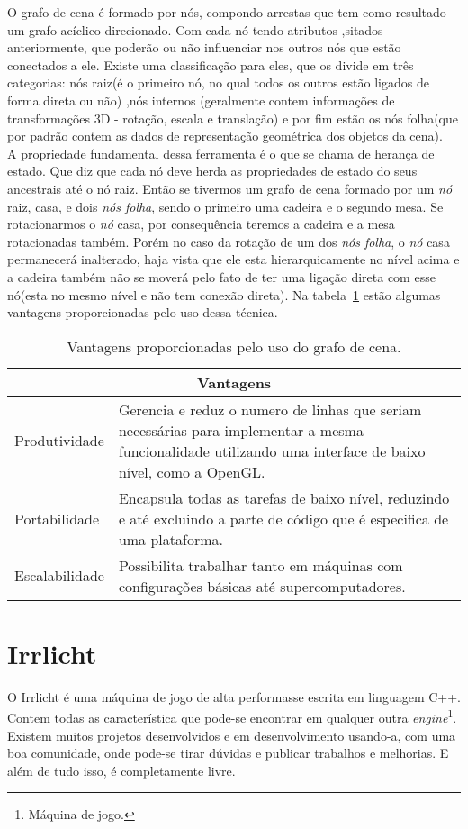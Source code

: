 O grafo de cena é formado por nós, compondo arrestas que tem como resultado um grafo acíclico direcionado. Com cada nó tendo atributos ,sitados anteriormente, que poderão ou não influenciar nos outros nós que estão conectados a ele. Existe uma classificação para eles, que os divide em três categorias: nós raiz(é o primeiro nó, no qual todos os outros estão ligados de forma direta ou não) ,nós internos (geralmente contem informações de transformações 3D - rotação, escala e translação) e por fim estão os nós folha(que por padrão contem as dados de representação geométrica dos objetos da cena).\\ 

A propriedade fundamental dessa ferramenta é o que se chama de herança de estado. Que diz que cada nó deve herda as propriedades de estado do seus ancestrais até o nó raiz. Então se tivermos um grafo de cena formado por um \textit{nó} raiz, casa, e dois \textit{nós folha}, sendo o primeiro uma cadeira e o segundo mesa. Se rotacionarmos o \textit{nó} casa, por consequência teremos a cadeira e a mesa rotacionadas também. Porém no caso da rotação de um dos \textit{nós folha}, o \textit{nó} casa permanecerá inalterado, haja vista que ele esta hierarquicamente no nível acima e a cadeira também não se moverá pelo fato de ter uma ligação direta com esse nó(esta no mesmo nível e não tem conexão direta). Na tabela~\ref{tb:grafo_cena} estão algumas vantagens proporcionadas pelo uso dessa técnica.\\

\begin{table}
\centering
\begin{tabular}{|p{3cm}|p{8cm}|}
	\hline
	\multicolumn{2}{|c|}{Vantagens} \\ \hline
	Produtividade &  Gerencia e reduz o numero de linhas que seriam necessárias para implementar
a mesma funcionalidade utilizando uma interface de baixo nível, como a OpenGL.\\ \hline
	Portabilidade &  Encapsula todas as tarefas de baixo nível, reduzindo e até 
excluindo a parte de código que é especifica de uma plataforma.\\ \hline
	Escalabilidade &  Possibilita trabalhar tanto em máquinas com configurações básicas até supercomputadores.\\ 
	\hline
\end{tabular}
\caption{Vantagens proporcionadas pelo uso do grafo de cena.}
\label{tb:grafo_cena}
\end{table}

\section{Irrlicht}
O Irrlicht é uma máquina de jogo de alta performasse escrita em linguagem C++\cite{irrlichtbook}. Contem todas as característica que pode-se encontrar em qualquer outra \textit{engine}\footnote{Máquina de jogo.}. Existem muitos projetos desenvolvidos e em desenvolvimento usando-a, com uma boa comunidade, onde pode-se tirar dúvidas e publicar trabalhos e melhorias. E além de tudo isso, é completamente livre\cite{irrlicht}.\\


